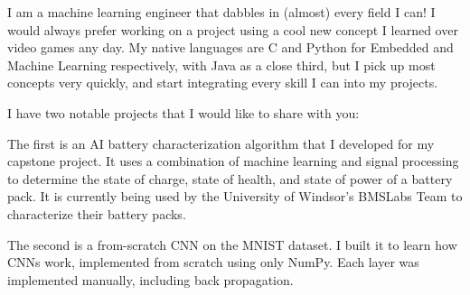 I am a machine learning engineer that dabbles in (almost) every field I can! I would always prefer working on a project using a cool new concept I learned over video games any day. My native languages are C and Python for Embedded and Machine Learning respectively, with Java as a close third, but I pick up most concepts very quickly, and start integrating every skill I can into my projects.

I have two notable projects that I would like to share with you:

The first is an AI battery characterization algorithm that I developed for my capstone project. It uses a combination of machine learning and signal processing to determine the state of charge, state of health, and state of power of a battery pack. It is currently being used by the University of Windsor's BMSLabs Team to characterize their battery packs.

The second is a from-scratch CNN on the MNIST dataset. I built it to learn how CNNs work, implemented from scratch using only NumPy. Each layer was implemented manually, including back propagation.